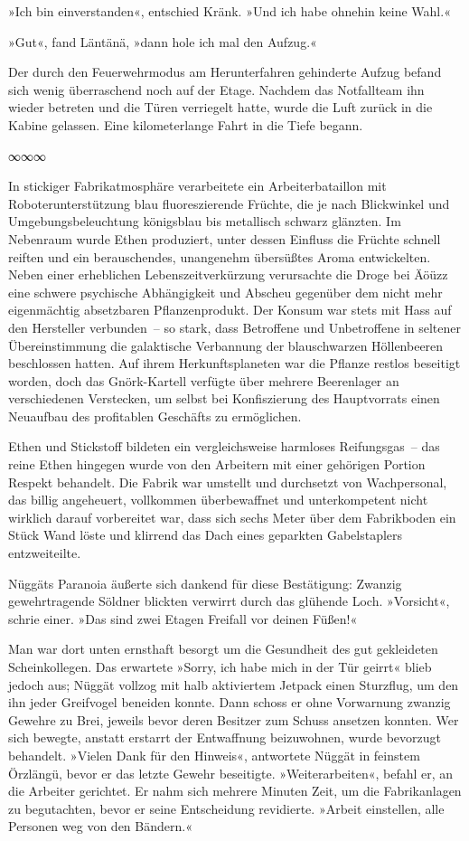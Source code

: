 »Ich bin einverstanden«, entschied Kränk. »Und ich habe ohnehin keine Wahl.«

»Gut«, fand Läntänä, »dann hole ich mal den Aufzug.«

Der durch den Feuerwehrmodus am Herunterfahren gehinderte Aufzug befand sich wenig überraschend noch auf der Etage. Nachdem das Notfallteam ihn wieder betreten und die Türen verriegelt hatte, wurde die Luft zurück in die Kabine gelassen. Eine kilometerlange Fahrt in die Tiefe begann.

\begin{center}
∞∞∞
\end{center}

In stickiger Fabrikatmosphäre verarbeitete ein Arbeiterbataillon mit Roboterunterstützung blau fluoreszierende Früchte, die je nach Blickwinkel und Umgebungsbeleuchtung königsblau bis metallisch schwarz glänzten. Im Nebenraum wurde Ethen produziert, unter dessen Einfluss die Früchte schnell reiften und ein berauschendes, unangenehm übersüßtes Aroma entwickelten. Neben einer erheblichen Lebenszeitverkürzung verursachte die Droge bei Äöüzz eine schwere psychische Abhängigkeit und Abscheu gegenüber dem nicht mehr eigenmächtig absetzbaren Pflanzenprodukt. Der Konsum war stets mit Hass auf den Hersteller verbunden~– so stark, dass Betroffene und Unbetroffene in seltener Übereinstimmung die galaktische Verbannung der blauschwarzen Höllenbeeren beschlossen hatten. Auf ihrem Herkunftsplaneten war die Pflanze restlos beseitigt worden, doch das Gnörk-Kartell verfügte über mehrere Beerenlager an verschiedenen Verstecken, um selbst bei Konfiszierung des Hauptvorrats einen Neuaufbau des profitablen Geschäfts zu ermöglichen.

Ethen und Stickstoff bildeten ein vergleichsweise harmloses Reifungsgas~– das reine Ethen hingegen wurde von den Arbeitern mit einer gehörigen Portion Respekt behandelt. Die Fabrik war umstellt und durchsetzt von Wachpersonal, das billig angeheuert, vollkommen überbewaffnet und unterkompetent nicht wirklich darauf vorbereitet war, dass sich sechs Meter über dem Fabrikboden ein Stück Wand löste und klirrend das Dach eines geparkten Gabelstaplers entzweiteilte.

Nüggäts Paranoia äußerte sich dankend für diese Bestätigung: Zwanzig gewehrtragende Söldner blickten verwirrt durch das glühende Loch. »Vorsicht«, schrie einer. »Das sind zwei Etagen Freifall vor deinen Füßen!«

Man war dort unten ernsthaft besorgt um die Gesundheit des gut gekleideten Scheinkollegen. Das erwartete »Sorry, ich habe mich in der Tür geirrt« blieb jedoch aus; Nüggät vollzog mit halb aktiviertem Jetpack einen Sturzflug, um den ihn jeder Greifvogel beneiden konnte. Dann schoss er ohne Vorwarnung zwanzig Gewehre zu Brei, jeweils bevor deren Besitzer zum Schuss ansetzen konnten. Wer sich bewegte, anstatt erstarrt der Entwaffnung beizuwohnen, wurde bevorzugt behandelt. »Vielen Dank für den Hinweis«, antwortete Nüggät in feinstem Örzlängü, bevor er das letzte Gewehr beseitigte. »Weiterarbeiten«, befahl er, an die Arbeiter gerichtet. Er nahm sich mehrere Minuten Zeit, um die Fabrikanlagen zu begutachten, bevor er seine Entscheidung revidierte. »Arbeit einstellen, alle Personen weg von den Bändern.«


